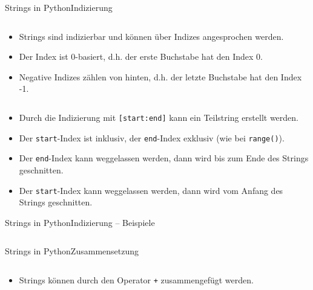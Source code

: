 \documentclass[xelatex,aspectratio=169]{beamer}
\begin{document}
\begin{frame}{Strings in Python}{Indizierung}
    \inputminted[lastline=3]{python}{src/strings_index.py}
    \begin{itemize}
        \item Strings sind indizierbar und können über Indizes angesprochen werden.
        \item Der Index ist 0-basiert, d.h. der erste Buchstabe hat den Index 0.
        \item Negative Indizes zählen von hinten, d.h. der letzte Buchstabe hat den Index -1.
    \end{itemize}
    \inputminted[firstline=5]{python}{src/strings_index.py}
    \begin{itemize}
        \item Durch die Indizierung mit \texttt{[start:end]} kann ein Teilstring erstellt werden.
        \item Der \texttt{start}-Index ist inklusiv, der \texttt{end}-Index exklusiv (wie bei \texttt{range()}).
        \item Der \texttt{end}-Index kann weggelassen werden, dann wird bis zum Ende des Strings geschnitten.
        \item Der \texttt{start}-Index kann weggelassen werden, dann wird vom Anfang des Strings geschnitten.
    \end{itemize}

\end{frame}

\begin{frame}{Strings in Python}{Indizierung -- Beispiele}
    \inputminted{python}{src/strings_index_examples.py}
\end{frame}

\begin{frame}{Strings in Python}{Zusammensetzung}
    \inputminted{python}{src/strings_concat.py}
    \begin{itemize}
        \item Strings können durch den Operator \texttt{+} zusammengefügt werden.
    \end{itemize}
\end{frame}
\end{document}
